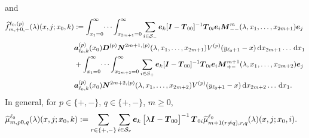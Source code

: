 and 
\begin{align*}
	\widehat{f}_{m,+0,-}^{\ell_0,(p)}(\lambda)(x,j;x_0,k)\nonumber 
	&:=\int_{x_1=0}^\infty \dots \int_{x_{2m+1}=0}^\infty \sum_{i\in\mathcal{S}_-} \boldsymbol e_k [\boldsymbol I - \boldsymbol T_{00}]^{-1}\boldsymbol T_{0i}\boldsymbol e_i \boldsymbol M^m_{--}(\lambda,x_1,\dots,x_{2m+1})\boldsymbol e_j \nonumber
	\\& \boldsymbol a_{\ell_0,k}^{(p)}(x_0) \boldsymbol D^{(p)} \boldsymbol N^{2m+1,(p)}(\lambda,x_1,\dots,x_{2m+1}) V^{(p)}(y_{\ell_0+1}-x)\, \mathrm{d} x_{2m+1}\dots  \, \mathrm{d} x_1  \nonumber
	\\& + \int_{x_1=0}^\infty \dots \int_{x_{2m+2}=0}^\infty \sum_{i\in\mathcal{S}_+} \boldsymbol e_k [\boldsymbol I - \boldsymbol T_{00}]^{-1}\boldsymbol T_{0i}\boldsymbol e_i \boldsymbol M^{m+1}_{+-}(\lambda,x_1,\dots,x_{2m+2})\boldsymbol e_j \nonumber
	\\& \boldsymbol a_{\ell_0,k}^{(p)}(x_0)\boldsymbol N^{2m+2,(p)}(\lambda,x_1,\dots,x_{2m+2}) V^{(p)}(y_{\ell_0+1}-x)\, \mathrm{d} x_{2m+2}\dots  \, \mathrm{d} x_1.
\end{align*}
In general, for \(p\in \{+,-\}, \, q\in\{+,-\}\), \(m\geq 0\),
\begin{align*}
	\widehat \mu_{m,p0,q}^{\ell_0}(\lambda)(x,j;x_0,k) \nonumber 
	&:= \sum_{r\in\{+,-\}}\sum_{i\in\mathcal{S}_r}\boldsymbol e_k\begin{bmatrix} \lambda \boldsymbol I - \boldsymbol T_{00} \end{bmatrix}^{-1}\boldsymbol T_{0i}\widehat \mu_{m+1(r\neq q),r,q}^{\ell_0}(\lambda)(x,j;x_0,i).
\end{align*}


